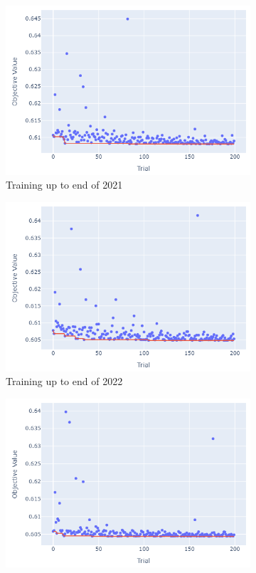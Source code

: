 \documentclass[12pt,twoside]{report}
\begin{document}
\begin{figure}[htb]
\begin{subfigure}{.33\linewidth}
  \includegraphics[width=0.95\linewidth]{figures/lr_cutoff_2021.png}
  \caption{Training up to end of 2021}
\end{subfigure}
\par\bigskip
\par\bigskip
\begin{subfigure}{.33\linewidth}
  \centering
  \includegraphics[width=0.95\linewidth]{figures/lr_cutoff_2022.png}
  \caption{Training up to end of 2022}
\end{subfigure}%
\begin{subfigure}{.33\linewidth}
  \centering
  \includegraphics[width=0.95\linewidth]{figures/lr_cutoff_2023.png}

\end{subfigure}
\end{figure}
\end{document}
